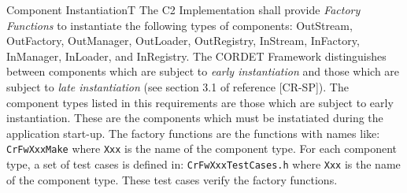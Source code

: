 \documentclass{pnp_article}
\begin{document}
\begin{fwReq}{Component Instantiation}{T}
{The C2 Implementation shall provide \textit{Factory Functions} to instantiate the following types of components: OutStream, OutFactory, OutManager, OutLoader, OutRegistry, InStream, InFactory, InManager, InLoader, and InRegistry.}
{The CORDET Framework distinguishes between components which are subject to \textit{early instantiation} and those which are subject to \textit{late instantiation} (see section 3.1 of reference [CR-SP]). The component types listed in this requirements are those which are subject to early instantiation. These are the components which must be instatiated during the application start-up.}
{The factory functions are the functions with names like: \texttt{CrFwXxxMake} where \texttt{Xxx} is the name of the component type. } 
{For each component type, a set of test cases is defined in: \texttt{CrFwXxxTestCases.h} where \texttt{Xxx} is the name of the component type. These test cases verify the factory functions.}
\end{fwReq}
\end{document}
